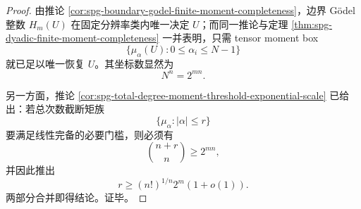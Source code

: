 \begin{proof}
由推论 \ref{cor:spg-boundary-godel-finite-moment-completeness}，边界 Gödel 整数 \(H_m(U)\) 在固定分辨率类内唯一决定 \(U\)；而同一推论与定理 \ref{thm:spg-dyadic-finite-moment-completeness} 一并表明，只需 tensor moment box
\[
\{\mu_\alpha(U):0\le \alpha_i\le N-1\}
\]
就已足以唯一恢复 \(U\)。其坐标数显然为
\[
N^n=2^{mn}.
\]

另一方面，推论 \ref{cor:spg-total-degree-moment-threshold-exponential-scale} 已给出：若总次数截断矩族
\[
\{\mu_\alpha:|\alpha|\le r\}
\]
要满足线性完备的必要门槛，则必须有
\[
\binom{n+r}{n}\ge 2^{mn},
\]
并因此推出
\[
r\ge (n!)^{1/n}2^m(1+o(1)).
\]
两部分合并即得结论。证毕。
\end{proof}

\endinput
